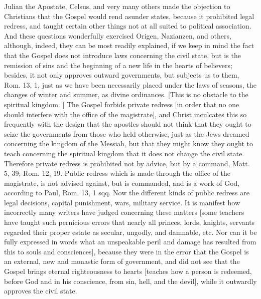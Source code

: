 Julian the Apostate, Celsus, and very many others made the objection
to Christians that the Gospel would rend asunder states, because it
prohibited legal redress, and taught certain other things not at all
suited to political association.  And these questions wonderfully
exercised Origen, Nazianzen, and others, although, indeed, they can
be most readily explained, if we keep in mind the fact that the
Gospel does not introduce laws concerning the civil state, but is the
remission of sins and the beginning of a new life in the hearts of
believers; besides, it not only approves outward governments, but
subjects us to them, Rom. 13, 1, just as we have been necessarily
placed under the laws of seasons, the changes of winter and summer,
as divine ordinances.  [This is no obstacle to the spiritual kingdom.
] The Gospel forbids private redress [in order that no one should
interfere with the office of the magistrate], and Christ inculcates
this so frequently with the design that the apostles should not think
that they ought to seize the governments from those who held
otherwise, just as the Jews dreamed concerning the kingdom of the
Messiah, but that they might know they ought to teach concerning the
spiritual kingdom that it does not change the civil state.  Therefore
private redress is prohibited not by advice, but by a command, Matt.
5, 39; Rom. 12, 19. Public redress which is made through the office
of the magistrate, is not advised against, but is commanded, and is a
work of God, according to Paul, Rom. 13, 1 sqq.  Now the different
kinds of public redress are legal decisions, capital punishment, wars,
military service.  It is manifest how incorrectly many writers have
judged concerning these matters [some teachers have taught such
pernicious errors that nearly all princes, lords, knights, servants
regarded their proper estate as secular, ungodly, and damnable, etc.
Nor can it be fully expressed in words what an unspeakable peril and
damage has resulted from this to souls and consciences], because they
were in the error that the Gospel is an external, new and monastic
form of government, and did not see that the Gospel brings eternal
righteousness to hearts [teaches how a person is redeemed, before God
and in his conscience, from sin, hell, and the devil], while it
outwardly approves the civil state.

